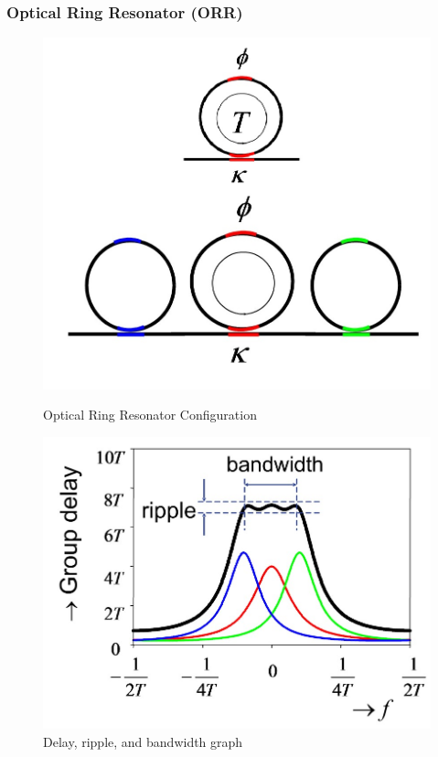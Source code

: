 \documentclass{beamer}
\begin{document}
\begin{frame}\frametitle{Optical Ring Resonator (ORR)}
	\begin{figure}[H]
			\begin{minipage}[t]{0.4\textwidth}
				\centering
				\includegraphics[width=\linewidth]{images/ORR}
				\caption{Optical Ring Resonator Configuration}
				\label{fig:ORR}
			\end{minipage}
				\hspace{\fill}
			\begin{minipage}[t]{0.55\textwidth}
				\centering
				\includegraphics[width=\linewidth]{images/ORR2}
				\caption{Delay, ripple, and bandwidth graph}
				\label{fig:ORR2}
			\end{minipage}
	\end{figure}
\end{frame}
\end{document}

